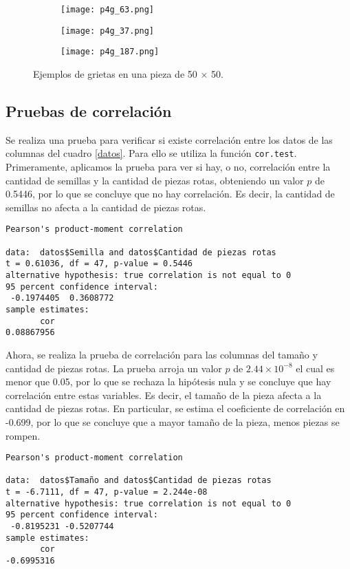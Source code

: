 \documentclass[12pt,letterpaper]{article}
\begin{document}
 \begin{figure}
 	\centering
 	\begin{subfigure}[b]{0.28\linewidth}
 		\texttt{[image: p4g\_63.png]}
 		 \caption{}
 		\label{grieta1}
 	\end{subfigure}
 	\begin{subfigure}[b]{0.28\linewidth}
 		\texttt{[image: p4g\_37.png]}
 		 \caption{}
 		\label{grieta2}
 	\end{subfigure}
 	\begin{subfigure}[b]{0.28\linewidth}
 		\texttt{[image: p4g\_187.png]}
 		\caption{}
 		\label{grieta3}
 	\end{subfigure}
 	\caption{Ejemplos de grietas en una pieza de 50 $\times$ 50.}  	
\label{grieta}
 \end{figure}

\subsection{Pruebas de correlación}
Se realiza una prueba para verificar si existe correlación entre los datos de las columnas del cuadro \ref{datos}. Para ello se utiliza la función \texttt{cor.test}. Primeramente, aplicamos la prueba para ver si hay, o no, correlación entre la cantidad de semillas y la cantidad de piezas rotas, obteniendo un valor $p$ de 0.5446, por lo que se concluye que no hay correlación. Es decir, la cantidad de semillas no afecta a la cantidad de piezas rotas.

\begin{verbatim}
Pearson's product-moment correlation

data:  datos$Semilla and datos$Cantidad de piezas rotas
t = 0.61036, df = 47, p-value = 0.5446
alternative hypothesis: true correlation is not equal to 0
95 percent confidence interval:
 -0.1974405  0.3608772
sample estimates:
       cor 
0.08867956 
\end{verbatim}

Ahora, se realiza la prueba de correlación para las columnas del tamaño y cantidad de piezas rotas. La prueba arroja un valor $p$ de $2.44\times 10^{-8}$ el cual es menor que 0.05, por lo que se rechaza la hipótesis nula y se concluye que hay correlación entre estas variables. Es decir, el tamaño de la pieza afecta a la cantidad de piezas rotas. En particular, se estima el coeficiente de correlación en -0.699, por lo que se concluye que a mayor tamaño de la pieza, menos piezas se rompen.

\begin{verbatim}
Pearson's product-moment correlation

data:  datos$Tamaño and datos$Cantidad de piezas rotas
t = -6.7111, df = 47, p-value = 2.244e-08
alternative hypothesis: true correlation is not equal to 0
95 percent confidence interval:
 -0.8195231 -0.5207744
sample estimates:
       cor 
-0.6995316 
\end{verbatim}

 

\end{document}
